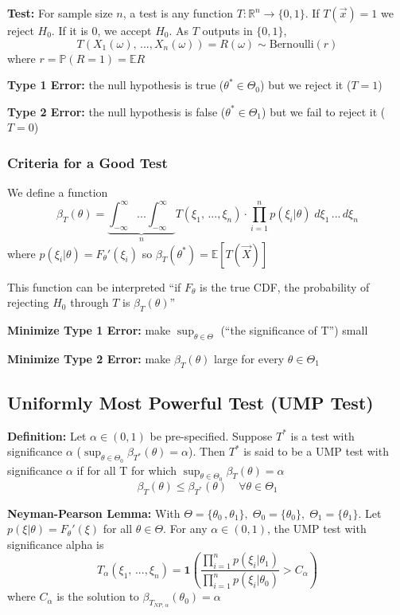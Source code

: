 \documentclass[12pt]{article}
\renewcommand{\P}{\mathbb{P}}
\newcommand{\R}{\mathbb{R}}
\newcommand{\E}{\mathbb{E}}
\begin{document}
\textbf{Test:} For sample size $n$, a test is any function $T: \R^n \to \{0, 1\}$. If $T(\vec{x}) = 1$ we reject $H_0$. If it is 0, we accept $H_0$. As $T$ outputs in $\{0, 1\}$,
\[T(X_1(\omega), \,..., X_n(\omega)) = R(\omega) \sim \text{Bernoulli}(r)\]
where $r= \P(R = 1) = \E R$ 

\textbf{Type 1 Error:} the null hypothesis is true ($\theta^* \in \Theta_0$) but we reject it ($T = 1$)

\textbf{Type 2 Error:} the null hypothesis is false ($\theta^* \in \Theta_1$) but we fail to reject it ($T = 0$)

\subsubsection*{Criteria for a Good Test}
We define a function 
\[\beta_T(\theta) = \underbrace{\int_{-\infty}^{\infty} ...\int_{-\infty}^{\infty}}_{n} T(\xi_1, \, ..., \xi_n) \cdot \prod_{i=1}^n p(\xi_i|\theta) \; d\xi_1\, ...\, d\xi_n\]
where $p(\xi_i |\theta) = F_\theta'(\xi_i)$ so $\beta_T(\theta^*) = \E[T(\vec{X})]$

This function can be interpreted ``if $F_\theta$ is the true CDF, the probability of rejecting $H_0$ through $T$ is $\beta_T(\theta)$''

\textbf{Minimize Type 1 Error:} make $\sup_{\theta \in \Theta}$ (``the significance of T'') small 

\textbf{Minimize Type 2 Error:} make $\beta_T(\theta)$ large for every $\theta \in \Theta_1$

\subsection{Uniformly Most Powerful Test (UMP Test)}
\textbf{Definition:} Let $\alpha \in (0, 1)$ be pre-specified. Suppose $T^*$ is a test with significance $\alpha$ ($\sup_{\theta \in \Theta_0} \beta_{T^*}(\theta) = \alpha$). Then $T^*$ is said to be a UMP test with significance $\alpha$ if for all T for which $\sup_{\theta \in \Theta_0} \beta_T(\theta) = \alpha$
\[\beta_T(\theta) \leq \beta_{T^*}(\theta) \quad \forall \theta \in \Theta_1\]

\textbf{Neyman-Pearson Lemma:} With $\Theta = \{\theta_0\, , \theta_1\}, \; \Theta_0 = \{\theta_0\}, \; \Theta_1 = \{\theta_1\}$. Let $p(\xi | \theta) = F_\theta'(\xi)$ for all $\theta \in \Theta$. For any $\alpha \in (0, 1)$, the UMP test with significance alpha is 
\[T_\alpha(\xi_1, \, ..., \xi_n) = \mathbf{1}\left(\frac{\prod_{i=1}^n p(\xi_i | \theta_1)}{\prod_{i=1}^n p(\xi_i | \theta_0)} > C_\alpha\right)\]
where $C_\alpha$ is the solution to $\beta_{T_{NP, \, \alpha}}(\theta_0) = \alpha$
\end{document}
